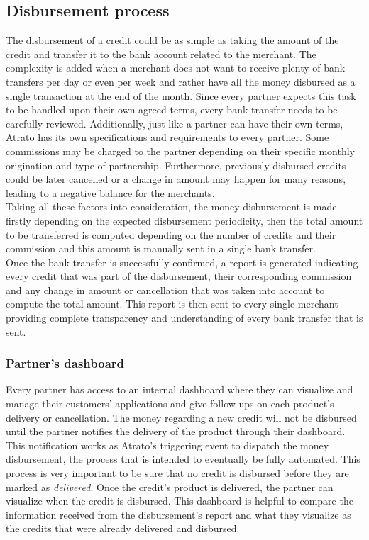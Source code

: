 \subsection{Disbursement process}
The disbursement of a credit could be as simple as taking the amount of the credit and transfer it to the bank account related to the merchant. The complexity is added when a merchant does not want to receive plenty of bank transfers per day or even per week and rather have all the money disbursed as a single transaction at the end of the month. Since every partner expects this task to be handled upon their own agreed terms, every bank transfer needs to be carefully reviewed. Additionally, just like a partner can have their own terms, Atrato has its own specifications and requirements to every partner. Some commissions may be charged to the partner depending on their specific monthly origination and type of partnership. Furthermore, previously disbursed credits could be later cancelled or a change in amount may happen for many reasons, leading to a negative balance for the merchants.\\

Taking all these factors into consideration, the money disbursement is made firstly depending on the expected disbursement periodicity, then the total amount to be transferred is computed depending on the number of credits and their commission and this amount is manually sent in a single bank transfer.\\

Once the bank transfer is successfully confirmed, a report is generated indicating every credit that was part of the disbursement, their corresponding commission and any change in amount or cancellation that was taken into account to compute the total amount. This report is then sent to every single merchant providing complete transparency and understanding of every bank transfer that is sent.

\subsubsection{Partner’s dashboard}

Every partner has access to an internal dashboard where they can visualize and manage their customers’ applications and give follow ups on each product’s delivery or cancellation. The money regarding a new credit will not be disbursed until the partner notifies the delivery of the product through their dashboard. This notification works as Atrato’s triggering event to dispatch the money disbursement, the process that is intended to eventually be fully automated. This process is very important to be sure that no credit is disbursed before they are marked as \textit{delivered}. Once the credit’s product is delivered, the partner can visualize when the credit is disbursed. This dashboard is helpful to compare the information received from the disbursement’s report and what they visualize as the credits that were already delivered and disbursed.

